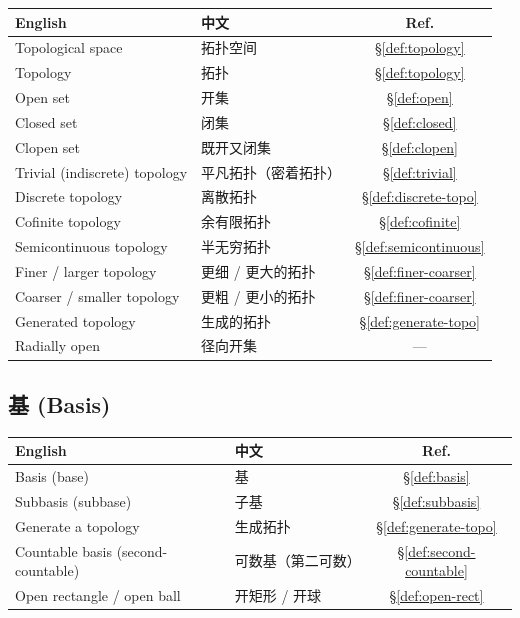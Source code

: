 \documentclass{article}
\begin{document}
\begin{tabular}{@{}lp{7.5cm}c@{}}
  \hline
  \textbf{English} & \textbf{中文} & \textbf{Ref.} \\
  \hline
  Topological space                & 拓扑空间 & \S\ref{def:topology} \\
  Topology                         & 拓扑 & \S\ref{def:topology} \\
  Open set                         & 开集 & \S\ref{def:open} \\
  Closed set                       & 闭集 & \S\ref{def:closed} \\
  Clopen set                       & 既开又闭集 & \S\ref{def:clopen} \\
  Trivial (indiscrete) topology    & 平凡拓扑（密着拓扑）& \S\ref{def:trivial} \\
  Discrete topology                & 离散拓扑 & \S\ref{def:discrete-topo} \\
  Cofinite topology                & 余有限拓扑 & \S\ref{def:cofinite} \\
  Semicontinuous topology          & 半无穷拓扑 & \S\ref{def:semicontinuous} \\
  Finer / larger topology          & 更细 / 更大的拓扑 & \S\ref{def:finer-coarser} \\
  Coarser / smaller topology       & 更粗 / 更小的拓扑 & \S\ref{def:finer-coarser} \\
  Generated topology               & 生成的拓扑 & \S\ref{def:generate-topo} \\
  Radially open                    & 径向开集 & --- \\
  \hline
\end{tabular}

\subsection*{基 (Basis)}

\begin{tabular}{@{}lp{7.5cm}c@{}}
  \hline
  \textbf{English} & \textbf{中文} & \textbf{Ref.} \\
  \hline
  Basis (base)                     & 基 & \S\ref{def:basis} \\
  Subbasis (subbase)               & 子基 & \S\ref{def:subbasis} \\
  Generate a topology              & 生成拓扑 & \S\ref{def:generate-topo} \\
  Countable basis (second-countable) & 可数基（第二可数）&
  \S\ref{def:second-countable} \\
  Open rectangle / open ball       & 开矩形 / 开球 & \S\ref{def:open-rect} \\
  \hline
\end{tabular}
\end{document}
